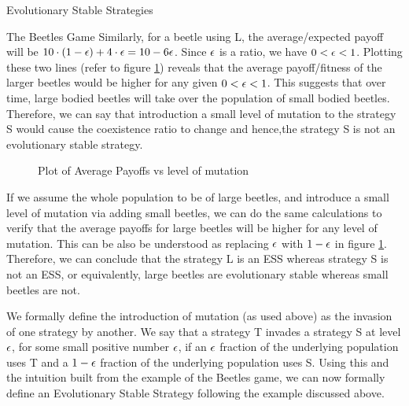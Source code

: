 \documentclass{article}
\begin{document}
\begin{ssection}{Evolutionary Stable Strategies}
\begin{sssubsection}{The Beetles Game}
		Similarly, for a beetle using L, the average/expected payoff will be $10 \cdot (1 - \epsilon) + 4 \cdot \epsilon = 10 - 6 \epsilon$. Since $\epsilon$ is a ratio, we have $0 < \epsilon < 1$. Plotting these two lines (refer to figure \ref{fig:beetle-small-ess}) reveals that the average payoff/fitness of the larger beetles would be higher for any given $0 < \epsilon < 1$. This suggests that over time, large bodied beetles will take over the population of small bodied beetles. Therefore, we can say that introduction a small level of mutation to the strategy S would cause the coexistence ratio to change and hence,the strategy S is not an evolutionary stable strategy.

		\begin{figure}[htpb]
			\centering
			\caption{Plot of Average Payoffs vs level of mutation}
			\label{fig:beetle-small-ess}
		\end{figure}

		If we assume the whole population to be of large beetles, and introduce a small level of mutation via adding small beetles, we can do the same calculations to verify that the average payoffs for large beetles will be higher for any level of mutation. This can be also be understood as replacing $\epsilon$ with $1 - \epsilon$ in figure \ref{fig:beetle-small-ess}. Therefore, we can conclude that the strategy L is an ESS whereas strategy S is not an ESS, or equivalently, large beetles are evolutionary stable whereas small beetles are not.

	\end{sssubsection}

	We formally define the introduction of mutation (as used above) as the invasion of one strategy by another. We say that a strategy T invades a strategy S at level $\epsilon$, for some small positive number $\epsilon$, if an $\epsilon$ fraction of the underlying population uses T and a $1 - \epsilon$ fraction of the underlying population uses S. Using this and the intuition built from the example of the Beetles game, we can now formally define an Evolutionary Stable Strategy following the example discussed above.


\end{ssection}
\end{document}
